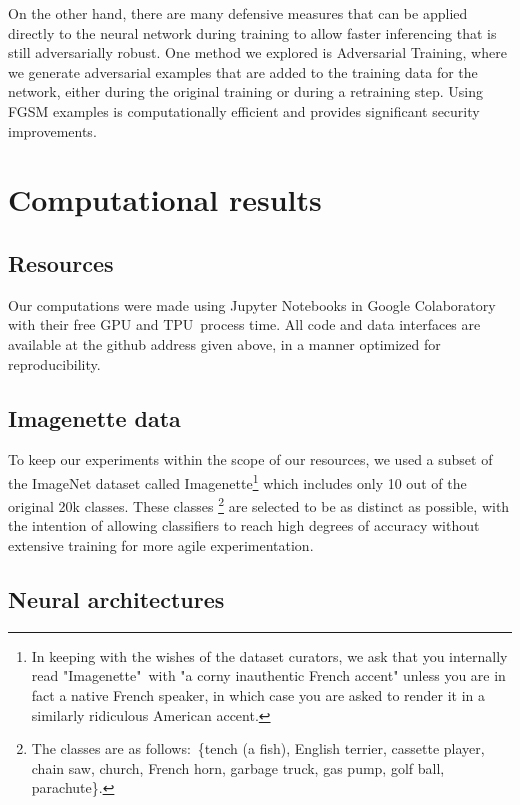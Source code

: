\documentclass[conference]{IEEEtran}
\begin{document}
On the other hand, there are many defensive measures that can be applied
directly to the neural network during training to allow faster inferencing
that is still adversarially robust. One method we explored is Adversarial
Training, where we generate adversarial examples that are added to the
training data for the network, either during the original training or during
a retraining step. Using FGSM examples is computationally efficient and
provides significant security improvements.

\section{Computational results}

\subsection{Resources}

Our computations were made using Jupyter Notebooks in Google Colaboratory
with their free GPU and TPU\ process time. All code and data interfaces are
available at the github address given above, in a manner optimized for
reproducibility.

\subsection{Imagenette data}

To keep our experiments within the scope of our resources, we used a subset
of the ImageNet dataset \cite{imagenet_cvpr09} called Imagenette\footnote{%
In keeping with the wishes of the dataset curators, we ask that you
internally read "Imagenette"\ with "a corny inauthentic French accent"
unless you are in fact a native French speaker, in which case you are asked
to render it in a similarly ridiculous American accent.} \cite{imagenette}
which includes only 10 out of the original 20k classes. These classes%
\footnote{%
The classes are as follows:\ \{tench (a fish), English terrier, cassette
player, chain saw, church, French horn, garbage truck, gas pump, golf ball,
parachute\}.} are selected to be as distinct as possible, with the intention
of allowing classifiers to reach high degrees of accuracy without extensive
training for more agile experimentation.

\subsection{Neural architectures}
\end{document}
